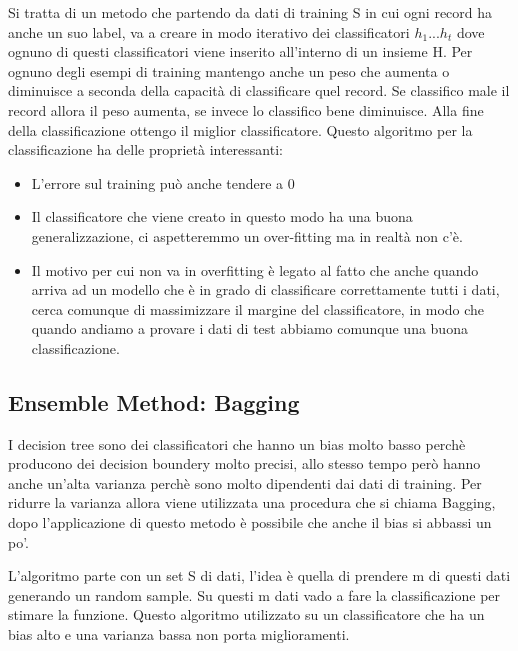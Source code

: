 \documentclass[14pt]{extreport}
\begin{document}
Si tratta di un metodo che partendo da dati di training S in cui ogni record ha anche un suo label, va a creare in modo iterativo dei classificatori $h_1$...$h_t$ dove ognuno di questi classificatori viene inserito all'interno di un insieme H.
Per ognuno degli esempi di training mantengo anche un peso che aumenta o diminuisce a seconda della capacità di classificare quel record. Se classifico male il record allora il peso aumenta, se invece lo classifico bene diminuisce.
Alla fine della classificazione ottengo il miglior classificatore.
Questo algoritmo per la classificazione ha delle proprietà interessanti:
\begin{itemize}
    \item L'errore sul training può anche tendere a 0
    \item Il classificatore che viene creato in questo modo ha una buona generalizzazione, ci aspetteremmo un over-fitting ma in realtà non c'è.
    \item Il motivo per cui non va in overfitting è legato al fatto che anche quando arriva ad un modello che è in grado di classificare correttamente tutti i dati, cerca comunque di massimizzare il margine del classificatore, in modo che quando andiamo a provare i dati di test abbiamo comunque una buona classificazione. 
\end{itemize}

\subsection{Ensemble Method: Bagging}

I decision tree sono dei classificatori che hanno un bias molto basso perchè producono dei decision boundery molto precisi, allo stesso tempo però hanno anche un'alta varianza perchè sono molto dipendenti dai dati di training.
Per ridurre la varianza allora viene utilizzata una procedura che si chiama Bagging, dopo l'applicazione di questo metodo è possibile che anche il bias si abbassi un po'.

L'algoritmo parte con un set S di dati, l'idea è quella di prendere m di questi dati generando un random sample. 
Su questi m dati vado a fare la classificazione per stimare la funzione.
Questo algoritmo utilizzato su un classificatore che ha un bias alto e una varianza bassa non porta miglioramenti.
\end{document}
